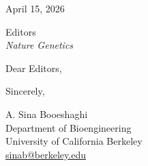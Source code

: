 \documentclass[11pt]{article}
\begin{document}
April 15, 2026

Editors\\
\textit{Nature Genetics}

Dear Editors,



Sincerely,

A. Sina Booeshaghi\\
Department of Bioengineering\\
University of California Berkeley\\
\href{mailto:sinab@berkeley.edu}{sinab@berkeley.edu}
\end{document}
